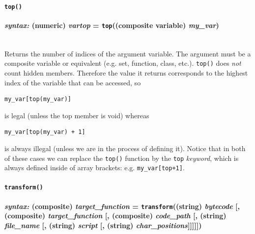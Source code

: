 \documentclass{article}
\newenvironment{code}{
       \begin{list}{}{
               \setlength{\leftmargin}{.4in}
               \setlength{\rightmargin}{0in}
               \setlength{\topsep}{.2in}
       }
       \small
       \item[] }
       { \end{list}   }
\begin{document}






\paragraph{\texttt{top()}\\\\
\normalfont \emph{syntax: } (numeric) \emph{vartop} = \texttt{top}((composite variable) \emph{my\_var})\\\\}

Returns the number of indices of the argument variable.  The argument must be a composite variable or equivalent (e.g. set, function, class, etc.).  \texttt{top()} does \emph{not} count hidden members.  Therefore the value it returns corresponds to the highest index of the variable that can be accessed, so

\begin{code} \begin{verbatim}
my_var[top(my_var)]
\end{verbatim} \end{code}

\noindent is legal (unless the top member is void) whereas

\begin{code} \begin{verbatim}
my_var[top(my_var) + 1]
\end{verbatim} \end{code}

\noindent is always illegal (unless we are in the process of defining it).  Notice that in both of these cases we can replace the \verb#top()# function by the \verb#top# \emph{keyword}, which is always defined inside of array brackets:  e.g. \verb#my_var[top+1]#.\\






\paragraph{\texttt{transform()}\\\\
\normalfont \emph{syntax: } (composite) \emph{target\_function} = \texttt{transform}((string) \emph{bytecode} [, (composite) \emph{target\_function} [, (composite) \emph{code\_path} [, (string) \emph{file\_name} [, (string) \emph{script} [, (string) \emph{char\_positions}]]]]])\\\\}
  
\end{document}

